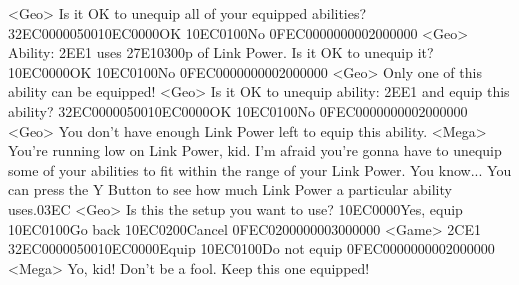 <Geo> Is it OK to unequip all of your equipped abilities? {32}{EC}{00}{00}{05}{00}{10}{EC}{00}{00}OK {10}{EC}{01}{00}No {0F}{EC}{00}{00}{00}{00}{02}{00}{00}{00}
<Geo> Ability: {2E}{E1} uses {27}{E1}{03}{00}p of Link Power. Is it OK to unequip it? {10}{EC}{00}{00}OK {10}{EC}{01}{00}No {0F}{EC}{00}{00}{00}{00}{02}{00}{00}{00}
<Geo> Only one of this ability can be equipped! 
<Geo> Is it OK to unequip ability: {2E}{E1} and equip this ability? {32}{EC}{00}{00}{05}{00}{10}{EC}{00}{00}OK {10}{EC}{01}{00}No {0F}{EC}{00}{00}{00}{00}{02}{00}{00}{00}
<Geo> You don't have enough Link Power left to equip this ability. 
<Mega> You're running low on Link Power, kid. 
I'm afraid you're gonna have to unequip some of your abilities 
to fit within the range of your Link Power. 
You know... You can press the 
Y Button to see how much Link Power a particular ability uses.{03}{EC}
<Geo> Is this the setup you want to use? {10}{EC}{00}{00}Yes, equip {10}{EC}{01}{00}Go back {10}{EC}{02}{00}Cancel {0F}{EC}{02}{00}{00}{00}{03}{00}{00}{00}
<Game> {2C}{E1} {32}{EC}{00}{00}{05}{00}{10}{EC}{00}{00}Equip {10}{EC}{01}{00}Do not equip {0F}{EC}{00}{00}{00}{00}{02}{00}{00}{00}
<Mega> Yo, kid! Don't be a fool. Keep this one equipped! 

